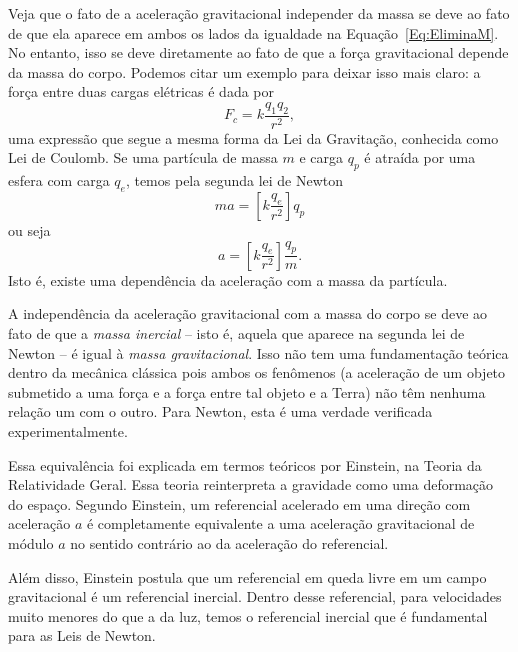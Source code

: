 Veja que o fato de a aceleração gravitacional independer da massa se deve ao fato de que ela aparece em ambos os lados da igualdade na Equação~\eqref{Eq:EliminaM}. No entanto, isso se deve diretamente ao fato de que a força gravitacional depende da massa do corpo. Podemos citar um exemplo para deixar isso mais claro: a força entre duas cargas elétricas é dada por
\begin{equation}
  F_c = k \frac{q_1q_2}{r^2},
\end{equation}
%
uma expressão que segue a mesma forma da Lei da Gravitação, conhecida como Lei de Coulomb. Se uma partícula de massa $m$ e carga $q_p$ é atraída por uma esfera com carga $q_e$, temos pela segunda lei de Newton
\begin{equation}
  ma = \left[k \frac{q_e}{r^2}\right] q_p
\end{equation}
%
ou seja
\begin{equation}
  a = \left[k \frac{q_e}{r^2}\right] \frac{q_p}{m}.
\end{equation}
%
Isto é, existe uma dependência da aceleração com a massa da partícula.

A independência da aceleração gravitacional com a massa do corpo se deve ao fato de que a \emph{massa inercial} -- isto é, aquela que aparece na segunda lei de Newton -- é igual à \emph{massa gravitacional}. Isso não tem uma fundamentação teórica dentro da mecânica clássica pois ambos os fenômenos (a aceleração de um objeto submetido a uma força e a força entre tal objeto e a Terra) não têm nenhuma relação um com o outro. Para Newton, esta é uma verdade verificada experimentalmente.

Essa equivalência foi explicada em termos teóricos por Einstein, na Teoria da Relatividade Geral. Essa teoria reinterpreta a gravidade como uma deformação do espaço. Segundo Einstein, um referencial acelerado em uma direção com aceleração $a$ é completamente equivalente a uma aceleração gravitacional de módulo $a$ no sentido contrário ao da aceleração do referencial.

Além disso, Einstein postula que um referencial em queda livre em um campo gravitacional é um referencial inercial. Dentro desse referencial, para velocidades muito menores do que a da luz, temos o referencial inercial que é fundamental para as Leis de Newton.


